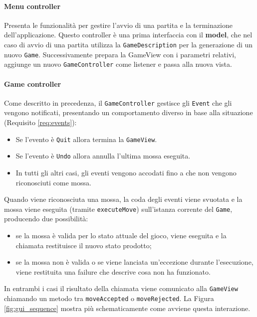 \paragraph{Menu controller}
Presenta le funzionalità per gestire l'avvio di una partita e la terminazione dell'applicazione.
%
Questo controller è una prima interfaccia con il \textbf{model}, che nel caso di avvio di una partita utilizza la \texttt{GameDescription} per la generazione di un nuovo \texttt{Game}.
%
Successivamente prepara la GameView con i parametri relativi, aggiunge un nuovo \texttt{GameController} come listener e passa alla nuova vista.

\paragraph{Game controller}
%
Come descritto in precedenza, il \texttt{GameController} gestisce gli \texttt{Event} che gli vengono notificati, presentando un comportamento diverso in base alla situazione (Requisito \ref{req:events}):
%
\begin{itemize}
    \item Se l'evento è \texttt{Quit} allora termina la \texttt{GameView}.
    \item Se l'evento è \texttt{Undo} allora annulla l'ultima mossa eseguita.
    \item In tutti gli altri casi, gli eventi vengono accodati fino a che non vengono riconosciuti come mossa.
\end{itemize}
%
Quando viene riconosciuta una mossa, la coda degli eventi viene svuotata e la mossa viene eseguita (tramite \texttt{executeMove}) sull'istanza corrente del \texttt{Game}, producendo due possibilità:
\begin{itemize}
    \item se la mossa è valida per lo stato attuale del gioco, viene eseguita e la chiamata restituisce il nuovo stato prodotto;
    \item se la mossa non è valida o se viene lanciata un'eccezione durante l'esecuzione, viene restituita una failure che descrive cosa non ha funzionato.
\end{itemize}
%
In entrambi i casi il risultato della chiamata viene comunicato alla \texttt{GameView} chiamando un metodo tra \texttt{moveAccepted} o \texttt{moveRejected}.
%
La Figura \ref{fig:gui_sequence} mostra più schematicamente come avviene questa interazione.
